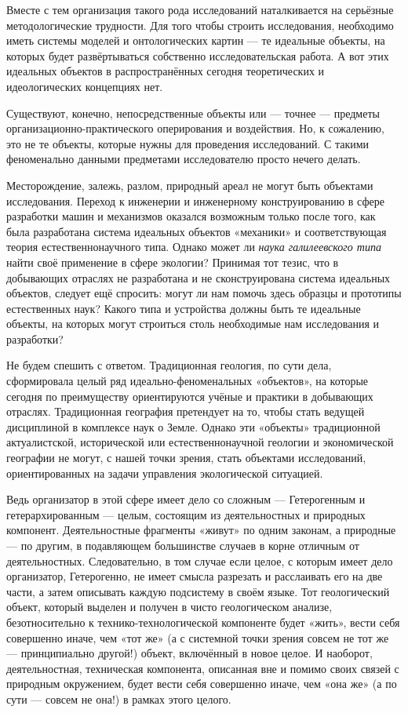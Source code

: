 \documentclass[11pt,a4paper]{article}
\begin{document}
Вместе с тем организация такого рода исследований наталкивается на серьёзные
методологические трудности. Для того чтобы строить исследования, необходимо
иметь системы моделей и онтологических картин — те идеальные объекты, на
которых будет развёртываться собственно исследовательская работа. А вот этих
идеальных объектов в распространённых сегодня теоретических и идеологических
концепциях нет. 

Существуют, конечно, непосредственные объекты или — точнее — предметы
организа\-ционно-практического оперирования и воздействия. Но, к сожалению,
это не те объекты, которые нужны для проведения исследований. С такими
феноменально данными предметами исследователю просто нечего делать.

Месторождение, залежь, разлом, природный ареал не могут быть объектами
исследования. Переход к инженерии и инженерному конструированию в сфере
разработки машин и механизмов оказался возможным только после того, как была
разработана система идеальных объектов «механики» и соответствующая теория
естественнонаучного типа. Однако может ли \emph{наука галилеевского типа}
найти своё применение в сфере экологии? Принимая тот тезис, что в добывающих
отраслях не разработана и не сконструирована система идеальных объектов,
следует ещё спросить: могут ли нам помочь здесь образцы и прототипы
естественных наук?  Какого типа и устройства должны быть те идеальные объекты,
на которых могут строиться столь необходимые нам исследования и разработки?

Не будем спешить с ответом. Традиционная геология, по сути дела, сформировала
целый ряд идеально-феноменальных «объектов», на которые сегодня по
преимуществу ориентируются учёные и практики в добывающих отраслях.
Традиционная география претендует на то, чтобы стать ведущей дисциплиной в
комплексе наук о Земле. Однако эти «объекты» традиционной актуалистской,
исторической или естественнонаучной геологии и экономической географии не
могут, с нашей точки зрения, стать объектами исследований, ориентированных на
задачи управления экологической ситуацией.

Ведь организатор в этой сфере имеет дело со сложным — Гетерогенным и
гетерархированным — целым, состоящим из деятельностных и природных компонент.
Деятельностные фрагменты «живут» по одним законам, а природные — по другим, в
подавляющем большинстве случаев в корне отличным от
деятельностных. Следовательно, в том случае если целое, с которым имеет дело
организатор, Гетерогенно, не имеет смысла разрезать и расслаивать его на две
части, а затем описывать каждую подсистему в своём языке. Тот геологический
объект, который выделен и получен в чисто геологическом анализе,
безотносительно к технико-технологической компоненте будет «жить», вести себя
совершенно иначе, чем «тот же» (а с системной точки зрения совсем не тот же —
принципиально другой!) объект, включённый в новое целое. И наоборот,
деятельностная, техническая компонента, описанная вне и помимо своих связей с
природным окружением, будет вести себя совершенно иначе, чем «она же» (а по
сути — совсем не она!) в рамках этого целого.
\end{document}
